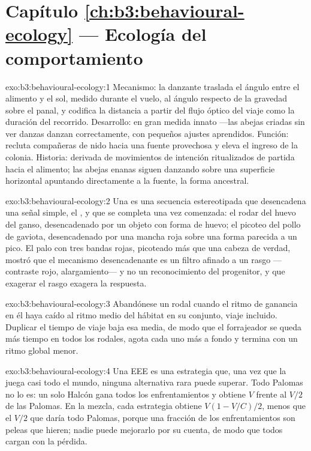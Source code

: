 \section*{Capítulo \ref{ch:b3:behavioural-ecology} --- Ecología del comportamiento}

\begin{solution}{exo:b3:behavioural-ecology:1}
Mecanismo: la danzante traslada el ángulo entre el alimento y el sol,
medido durante el vuelo, al ángulo respecto de la gravedad sobre el
panal, y codifica la distancia a partir del flujo óptico del viaje como
la duración del recorrido. Desarrollo: en gran medida innato ---las
abejas criadas sin ver danzas danzan correctamente, con pequeños
ajustes aprendidos. Función: recluta compañeras de nido hacia una
fuente provechosa y eleva el ingreso de la colonia. Historia: derivada
de movimientos de intención ritualizados de partida hacia el alimento;
las abejas enanas siguen danzando sobre una superficie horizontal
apuntando directamente a la fuente, la forma ancestral.
\end{solution}

\begin{solution}{exo:b3:behavioural-ecology:2}
Una  es una secuencia estereotipada que
desencadena una señal simple, el , y que se completa una
vez comenzada: el rodar del huevo del ganso, desencadenado por un objeto
con forma de huevo; el picoteo del pollo de gaviota, desencadenado por
una mancha roja sobre una forma parecida a un pico. El palo con tres
bandas rojas, picoteado más que una cabeza de verdad, mostró que el
mecanismo desencadenante es un filtro afinado a un rasgo ---contraste
rojo, alargamiento--- y no un reconocimiento del progenitor, y que
exagerar el rasgo exagera la respuesta.
\end{solution}

\begin{solution}{exo:b3:behavioural-ecology:3}
Abandónese un rodal cuando el ritmo de ganancia en él haya caído al
ritmo medio del hábitat en su conjunto, viaje incluido. Duplicar el
tiempo de viaje baja esa media, de modo que el forrajeador se queda más
tiempo en todos los rodales, agota cada uno más a fondo y termina con
un ritmo global menor.
\end{solution}

\begin{solution}{exo:b3:behavioural-ecology:4}
Una EEE es una estrategia que, una vez que la juega casi todo el mundo,
ninguna alternativa rara puede superar. Todo Palomas no lo es: un solo
Halcón gana todos los enfrentamientos y obtiene $V$ frente al $V/2$ de
las Palomas. En la mezcla, cada estrategia obtiene $V(1 - V/C)/2$, menos
que el $V/2$ que daría todo Palomas, porque una fracción de los
enfrentamientos son peleas que hieren; nadie puede mejorarlo por su
cuenta, de modo que todos cargan con la pérdida.
\end{solution}

